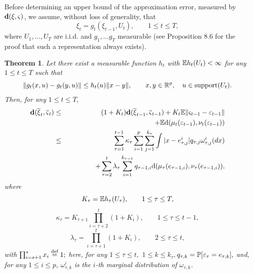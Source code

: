 \documentclass{article}              %
\newcommand{\tbd}[1]{{ \bf [ TBD #1 ]}}
\newtheorem{theorem}{Theorem}
\begin{document}
Before determining an upper bound of the approximation error, measured
by $\d(\xi,\varsigma)$, we assume, without loss of generality, that
\begin{equation}
\xi_{t}=g_{t}(\xi_{t-1},U_{t}),\qquad1\leq t\leq T,\label{eq:xxu}
\end{equation}
where $U_{1},\dots,U_{T}$ are i.i.d. and $g_{1},\dots g_{T}$ measurable (see \cite{Kallenberg02} Proposition
8.6 for the proof that such a representation always exists).

\begin{theorem}
\label{prop:est} Let there exist a measurable
function $h_{t}$ with $\E h_{t}(U_{t})<\infty$ for any $1\leq t\leq T$ such that 
\begin{equation}
\|g_{t}(x,u)-g_{t}(y,u)\|\leq h_{t}(u)\|x-y\|,\qquad
x,y\in\R^{p},\quad u\in\supp(U_{t}).\label{eq:htl}
\end{equation}
Then, for any $1\leq t\leq T,$ 
\begin{eqnarray}
\d(\barxi_{t},\barvs_{t}) & \leq & (1+K_{t})\d(\barxi_{t-1},\barvs_{t-1})+K_{t}\E\|\varsigma_{t-1}-\varepsilon_{t-1}\| \nonumber \\
& & \qquad \qquad +\E\dw(\mu_{t}(\varepsilon_{t-1}),\nu_{t}(\varepsilon_{t-1}))\label{eq:dfirst}\\
 & \leq & \sum_{\tau=1}^{t-1}\kappa_{\tau}\sum_{i=1}^{p}\sum_{j=1}^{k_{\tau}}\int|x-e_{\tau,j}^{i}|q_{\tau,j}\omega^i_{\tau,j}(dx)
\nonumber \\ 
& & \qquad \qquad +\sum_{\tau=2}^{t}\lambda_{\tau}\sum_{i=1}^{k_{\tau-1}}q_{\tau-1,i}\dw(\mu_{\tau}(e_{\text{\ensuremath{\tau}}-1,i}),\nu_{\tau}(e_{\tau-1,i})),\label{eq:dthird}
\end{eqnarray}
where
\[
K_{\tau}=\E h_\tau (U_{\tau}),\qquad1\leq\tau\leq T,
\]
\[
\kappa_{\tau}=K_{\tau+1}\prod_{i=\tau+2}^{t}(1+K_{i}),\qquad1\leq\tau\leq t-1,
\]
\[
\lambda_{\tau}=\prod_{i=\tau+1}^{t}(1+K_{i}),\qquad2\leq\tau\leq t,
\]
with $\prod_{i=s+1}^{s}x_{i}\defined1;$ here, \textup{\emph{for any
}}\textup{$1\leq\tau\leq t,$} $1\leq k\leq k_{\tau},$$q_{\tau,k}=\P[\varepsilon_{\tau}=e_{\tau,k}],$
and, for any $1\leq i\leq p$,\textup{\emph{ $\omega_{\tau,k}^{i}$
is the $i$-th marginal distribution of $\omega_{\tau,k}$. }}
\end{theorem}
\end{document}
